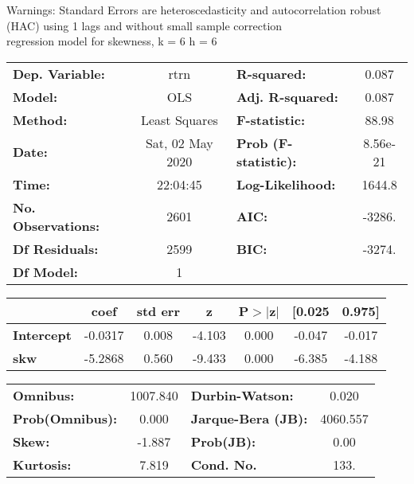 Warnings: \newline
 [1] Standard Errors are heteroscedasticity and autocorrelation robust (HAC) using 1 lags and without small sample correction\\ 

regression model for skewness, k = 6 h = 6\begin{center}
\begin{tabular}{lclc}
\toprule
\textbf{Dep. Variable:}    &       rtrn       & \textbf{  R-squared:         } &     0.087   \\
\textbf{Model:}            &       OLS        & \textbf{  Adj. R-squared:    } &     0.087   \\
\textbf{Method:}           &  Least Squares   & \textbf{  F-statistic:       } &     88.98   \\
\textbf{Date:}             & Sat, 02 May 2020 & \textbf{  Prob (F-statistic):} &  8.56e-21   \\
\textbf{Time:}             &     22:04:45     & \textbf{  Log-Likelihood:    } &    1644.8   \\
\textbf{No. Observations:} &        2601      & \textbf{  AIC:               } &    -3286.   \\
\textbf{Df Residuals:}     &        2599      & \textbf{  BIC:               } &    -3274.   \\
\textbf{Df Model:}         &           1      & \textbf{                     } &             \\
\bottomrule
\end{tabular}
\begin{tabular}{lcccccc}
                   & \textbf{coef} & \textbf{std err} & \textbf{z} & \textbf{P$> |$z$|$} & \textbf{[0.025} & \textbf{0.975]}  \\
\midrule
\textbf{Intercept} &      -0.0317  &        0.008     &    -4.103  &         0.000        &       -0.047    &       -0.017     \\
\textbf{skw}       &      -5.2868  &        0.560     &    -9.433  &         0.000        &       -6.385    &       -4.188     \\
\bottomrule
\end{tabular}
\begin{tabular}{lclc}
\textbf{Omnibus:}       & 1007.840 & \textbf{  Durbin-Watson:     } &    0.020  \\
\textbf{Prob(Omnibus):} &   0.000  & \textbf{  Jarque-Bera (JB):  } & 4060.557  \\
\textbf{Skew:}          &  -1.887  & \textbf{  Prob(JB):          } &     0.00  \\
\textbf{Kurtosis:}      &   7.819  & \textbf{  Cond. No.          } &     133.  \\
\bottomrule
\end{tabular}
\end{center}

